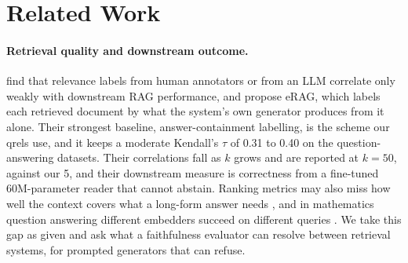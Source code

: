 %

\section{Related Work}
\label{sec:related}

\paragraph{Retrieval quality and downstream outcome.}
\citet{salemi-zamani-2024} find that relevance labels from human annotators or from an LLM correlate only weakly with downstream RAG performance, and propose eRAG, which labels each retrieved document by what the system's own generator produces from it alone. Their strongest baseline, answer-containment labelling, is the scheme our qrels use, and it keeps a moderate Kendall's $\tau$ of 0.31 to 0.40 on the question-answering datasets. Their correlations fall as $k$ grows and are reported at $k = 50$, against our 5, and their downstream measure is correctness from a fine-tuned 60M-parameter reader that cannot abstain. Ranking metrics may also miss how well the context covers what a long-form answer needs \citep{ju-etal-2025-controlled}, and in mathematics question answering different embedders succeed on different queries \citep{chen-etal-2025}. We take this gap as given and ask what a faithfulness evaluator can resolve between retrieval systems, for prompted generators that can refuse.

